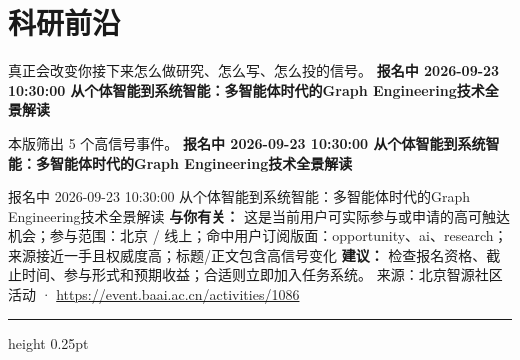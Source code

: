 \documentclass[10.5pt]{ctexart}
\begin{document}
\section*{科研前沿}
{\color{ormuted} 真正会改变你接下来怎么做研究、怎么写、怎么投的信号。}
\vspace{2mm}
{\LARGE\bfseries 报名中 2026-09-23 10:30:00 从个体智能到系统智能：多智能体时代的Graph Engineering技术全景解读}\par
\vspace{1mm}
{\color{ormuted} 本版筛出 5 个高信号事件。}
\vspace{3mm}
{\Large\bfseries 报名中 2026-09-23 10:30:00 从个体智能到系统智能：多智能体时代的Graph Engineering技术全景解读}\par
报名中 2026-09-23 10:30:00 从个体智能到系统智能：多智能体时代的Graph Engineering技术全景解读
\textbf{与你有关：} 这是当前用户可实际参与或申请的高可触达机会；参与范围：北京 / 线上；命中用户订阅版面：opportunity、ai、research；来源接近一手且权威度高；标题/正文包含高信号变化
\textbf{建议：} 检查报名资格、截止时间、参与形式和预期收益；合适则立即加入任务系统。
{\footnotesize\color{ormuted} 来源：北京智源社区活动 · \url{https://event.baai.ac.cn/activities/1086}}
\vspace{4mm}
\hrule height 0.25pt
\vspace{3mm}
\end{document}
